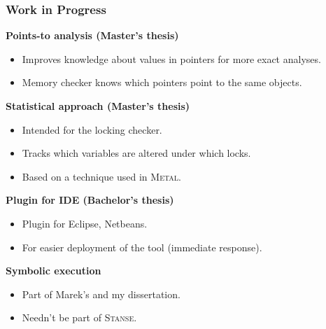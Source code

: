 \documentclass[xcolor=dvipsnames]{beamer}
\newcommand{\heading}[1]{\textbf{\textcolor{BurntOrange}{#1}}}
\begin{document}
\begin{frame}
  \frametitle{Work in Progress}
  \heading{Points-to analysis (Master's thesis)}
  \begin{itemize}
  \item Improves knowledge about values in pointers for more exact analyses.
  \item Memory checker knows which pointers point to the same objects.
  \end{itemize}

  \pause
  \medskip

  \heading{Statistical approach (Master's thesis)}
  \begin{itemize}
  \item Intended for the locking checker.
  \item Tracks which variables are altered under which locks.
  \item Based on a technique used in \textsc{Metal}.
  \end{itemize}

  \pause
  \medskip

  \heading{Plugin for IDE (Bachelor's thesis)}
  \begin{itemize}
  \item Plugin for Eclipse, Netbeans.
  \item For easier deployment of the tool (immediate response).
  \end{itemize}

  \pause
  \medskip

  \heading{Symbolic execution}
  \begin{itemize}
  \item Part of Marek's and my dissertation.
  \item Needn't be part of \textsc{Stanse}.
  \end{itemize}
\end{frame}
\end{document}
